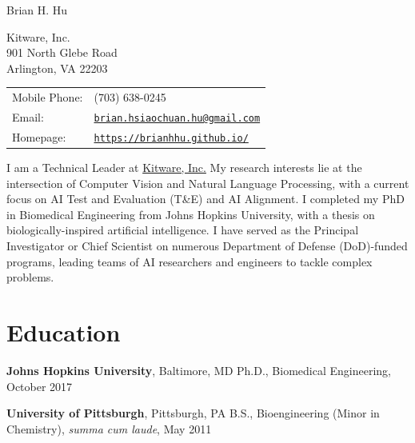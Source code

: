 \documentclass[10pt,letterpaper]{article}
\def\name{Brian H. Hu}
\renewenvironment{itemize}{
  \begin{list}{}{
    \setlength{\leftmargin}{1.5em}
    \setlength{\itemsep}{0.25em}
    \setlength{\parskip}{0pt}
    \setlength{\parsep}{0.25em}
  }
}{
  \end{list}
}
\begin{document}
{\huge \name}


\vspace{0.25in}

\begin{minipage}{0.475\linewidth}
  Kitware, Inc. \\
  901 North Glebe Road \\
  Arlington, VA 22203
\end{minipage}
\begin{minipage}{0.52\linewidth}
  \begin{tabular}{ll}
    Mobile Phone: & (703) 638-0245 \\
    Email: & \href{mailto:brian.hsiaochuan.hu@gmail.com}{\tt brian.hsiaochuan.hu@gmail.com} \\
    Homepage: & \href{https://brianhhu.github.io/}{\tt https://brianhhu.github.io/} \\
  \end{tabular}
\end{minipage}

\vspace{1em}
I am a Technical Leader at \href{https://www.kitware.com/ai/}{Kitware, Inc.} My research interests lie at the intersection of Computer Vision
and Natural Language Processing, with a current focus on AI Test and Evaluation (T\&E) and AI Alignment. I completed my PhD in Biomedical Engineering
from Johns Hopkins University, with a thesis on biologically-inspired artificial intelligence. I have served as the Principal Investigator or
Chief Scientist on numerous Department of Defense (DoD)-funded programs, leading teams of AI researchers and engineers to tackle complex problems.

\vspace{-0.1in}

\section*{Education}
\vspace{-0.05in}
\begin{itemize}
  \item \textbf{Johns Hopkins University}, Baltimore, MD
  \subitem Ph.D., Biomedical Engineering, October 2017
  
  \item \textbf{University of Pittsburgh}, Pittsburgh, PA
  \subitem B.S., Bioengineering (Minor in Chemistry), \textit{summa cum laude}, May 2011
\end{itemize}
\end{document}

